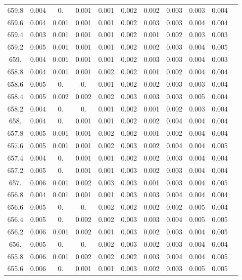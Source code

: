 \documentclass[12pt]{ctexart}
\numberwithin{equation}{section}
\begin{document}
\begin{longtable}{ccccccccccc}
659.8	&	0.004	&	0.	&	0.001	&	0.001	&	0.002	&	0.002	&	0.003	&	0.003	&	0.004	\\
659.6	&	0.004	&	0.001	&	0.001	&	0.001	&	0.002	&	0.003	&	0.003	&	0.004	&	0.004	\\
659.4	&	0.003	&	0.001	&	0.001	&	0.001	&	0.002	&	0.001	&	0.002	&	0.003	&	0.003	\\
659.2	&	0.005	&	0.001	&	0.001	&	0.001	&	0.002	&	0.002	&	0.003	&	0.004	&	0.005	\\
659.	&	0.004	&	0.001	&	0.001	&	0.001	&	0.002	&	0.003	&	0.003	&	0.004	&	0.003	\\
658.8	&	0.004	&	0.001	&	0.001	&	0.002	&	0.002	&	0.001	&	0.002	&	0.004	&	0.004	\\
658.6	&	0.005	&	0.	&	0.	&	0.001	&	0.002	&	0.002	&	0.003	&	0.003	&	0.004	\\
658.4	&	0.005	&	0.002	&	0.002	&	0.002	&	0.003	&	0.003	&	0.003	&	0.005	&	0.004	\\
658.2	&	0.004	&	0.	&	0.	&	0.001	&	0.002	&	0.001	&	0.002	&	0.003	&	0.004	\\
658.	&	0.004	&	0.	&	0.001	&	0.001	&	0.002	&	0.002	&	0.004	&	0.004	&	0.004	\\
657.8	&	0.005	&	0.001	&	0.001	&	0.002	&	0.002	&	0.001	&	0.002	&	0.004	&	0.004	\\
657.6	&	0.005	&	0.001	&	0.001	&	0.002	&	0.003	&	0.002	&	0.004	&	0.004	&	0.005	\\
657.4	&	0.004	&	0.	&	0.001	&	0.001	&	0.002	&	0.002	&	0.003	&	0.004	&	0.004	\\
657.2	&	0.005	&	0.	&	0.001	&	0.001	&	0.003	&	0.002	&	0.003	&	0.004	&	0.004	\\
657.	&	0.006	&	0.001	&	0.002	&	0.003	&	0.003	&	0.001	&	0.003	&	0.004	&	0.005	\\
656.8	&	0.004	&	0.001	&	0.001	&	0.001	&	0.003	&	0.003	&	0.004	&	0.004	&	0.004	\\
656.6	&	0.005	&	0.	&	0.	&	0.002	&	0.002	&	0.002	&	0.002	&	0.005	&	0.004	\\
656.4	&	0.005	&	0.	&	0.002	&	0.002	&	0.003	&	0.003	&	0.004	&	0.005	&	0.005	\\
656.2	&	0.006	&	0.001	&	0.002	&	0.001	&	0.003	&	0.002	&	0.003	&	0.004	&	0.005	\\
656.	&	0.005	&	0.	&	0.	&	0.002	&	0.003	&	0.002	&	0.003	&	0.004	&	0.004	\\
655.8	&	0.006	&	0.001	&	0.002	&	0.002	&	0.002	&	0.003	&	0.004	&	0.004	&	0.005	\\
655.6	&	0.006	&	0.	&	0.001	&	0.001	&	0.003	&	0.002	&	0.003	&	0.005	&	0.005	\\

\end{longtable}
\end{document}

